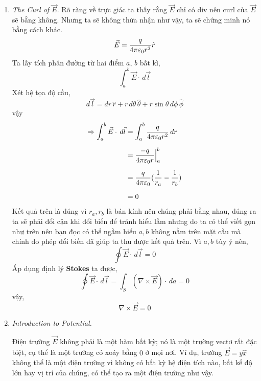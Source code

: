 \begin{enumerate}
\begin{sol}
Ta vẽ hình hộp sao cho mặt phẳng chia đôi hộp, mặt trên của hộp có diện tích là $A$ mặt bên dưới cũng là $A$. Giả sử có điện trường được sinh ra bởi mặt, khi này $\vec{E}$ sẽ hướng ra ngoài mặt sao cho chúng vuông góc với mặt. Áp dụng định lý Gauss ta được,
\[
\oint_{S} \vec{E} \cdot \, da =  \frac{Q_{enc}}{\ep_{0}}
\]
Trong trường hợp này $Q_{enc} = \sigma A$ với $A$ là phần diện tích của nắp hộp. Sử dụng tính đối xứng ta được,
\[
\oint_{S} \vec{E} \cdot \, da = \left| E \right| \oint_{S}  \, da_{//} = \left| E \right| 2A
\]
vậy,
\[
\left| E \right| 2A = \frac{1}{\ep_{0}}\sigma A \Leftrightarrow \vec{E} = \frac{\sigma}{2\ep_{0}}\hat{n}
\]

\end{sol}

\item \textit{The Curl of $\vec{E}$.}
Rõ ràng về trực giác ta thấy rằng $\vec{E}$ chỉ có div nên curl của $\vec{E}$ sẽ bằng không. Nhưng ta sẽ không thừa nhận như vậy, ta sẽ chứng minh nó bằng cách khác.
\[
\vec{E} = \frac{q}{4\pi\varepsilon_{0}r^2}\hat{r}
\]
Ta lấy tích phân đường từ hai điểm $a$, $b$ bất kì,
\[
\int_{a}^{b} \vec{E} \cdot \, d\vec{l}
\]
Xét hệ tọa độ cầu,
\[
d\vec{l} = dr\,\hat{r} + r\,d\theta\,\hat{\theta} + r\sin\theta\,d\phi\,\hat{\phi}\]
vậy
\begin{align*}
\Rightarrow \int_{a}^{b} \vec{E} \cdot \, d\vec{l} &= \int_{a}^{b} \frac{q}{4\pi\varepsilon_{0}r^2} \, dr \\[6pt]
&= \frac{-q}{4\pi\varepsilon_{0}r} \Big|_{a}^{b}\\[6pt]
&= \frac{q}{4\pi\varepsilon_{0}}(\frac{1}{r_{a}} - \frac{1}{r_{b}})\\[6pt]
&= 0
\end{align*}
Kết quả trên là đúng vì $r_{a},r_{b}$ là bán kính nên chúng phải bằng nhau, đúng ra ta sẽ phải đổi cận khi đổi biến để tránh hiểu lầm nhưng do ta có thể viết gọn như trên nên bạn đọc có thể ngầm hiểu $a,b$ không nằm trên mặt cầu mà chính do phép đổi biến đã giúp ta thu được kết quả trên. Vì $a,b$ tùy ý nên,
\[
\oint \vec{E} \cdot \, d\vec{l} = 0
\]
Áp dụng định lý \textbf{Stokes} ta được,
\[
\oint \vec{E} \cdot \, d\vec{l} = \int_{S} (\nabla \times \vec{E}) \cdot \, da = 0
\]
vậy,
\[
\boxed{\nabla \times \vec{E} = 0}
\]

\item \textit{Introduction to Potential.}

Điện trường $\vec{E}$ không phải là một hàm bất kỳ; nó là một trường vectơ rất đặc biệt, cụ thể là một trường có xoáy bằng $0$ ở mọi nơi. Ví dụ, trường $\vec{E} = y\hat{x}$ không thể là một điện trường vì không có bất kỳ hệ điện tích nào, bất kể độ lớn hay vị trí của chúng, có thể tạo ra một điện trường như vậy.


\end{enumerate}
